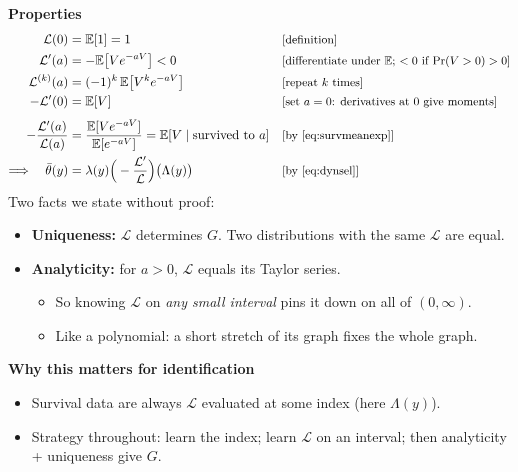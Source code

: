 \documentclass[11pt]{article}
\newcommand{\E}{\mathbb{E}}
\newcommand{\1}{\mathbf{1}}
\newcommand{\Lap}{\mathcal{L}}
\newcommand{\why}[1]{\text{\small[#1]}}
\begin{document}
\textbf{Properties}
\begin{align}
  \Lap(0) &= \E[1] = 1 && \why{definition} \nonumber\\
  \Lap'(a) &= -\E\big[Ve^{-aV}\big] < 0 && \why{differentiate under $\E$; $<0$ if $\Pr(V>0)>0$} \nonumber\\
  \Lap^{(k)}(a) &= (-1)^k\,\E\big[V^ke^{-aV}\big] && \why{repeat $k$ times} \nonumber\\
  -\Lap'(0) &= \E[V] && \why{set $a=0$: derivatives at 0 give moments} \nonumber\\[4pt]
  -\frac{\Lap'(a)}{\Lap(a)} &= \frac{\E[Ve^{-aV}]}{\E[e^{-aV}]} = \E[V\mid\text{survived to }a] && \why{by \eqref{eq:survmeanexp}} \label{eq:survmean}\\
  \Longrightarrow\quad \bar\theta(y) &= \lambda(y)\Big(-\frac{\Lap'}{\Lap}\Big)\big(\Lambda(y)\big) && \why{by \eqref{eq:dynsel}} \nonumber
\end{align}
Two facts we state without proof:
\begin{itemize}
  \item \textbf{Uniqueness:} $\Lap$ determines $G$. Two distributions with the same $\Lap$ are equal.
  \item \textbf{Analyticity:} for $a>0$, $\Lap$ equals its Taylor series.
    \begin{itemize}
      \item So knowing $\Lap$ on \emph{any small interval} pins it down on all of $(0,\infty)$.
      \item Like a polynomial: a short stretch of its graph fixes the whole graph.
    \end{itemize}
\end{itemize}
\textbf{Why this matters for identification}
\begin{itemize}
  \item Survival data are always $\Lap$ evaluated at some index (here $\Lambda(y)$).
  \item Strategy throughout: learn the index; learn $\Lap$ on an interval; then analyticity + uniqueness give $G$.
\end{itemize}
\end{document}

